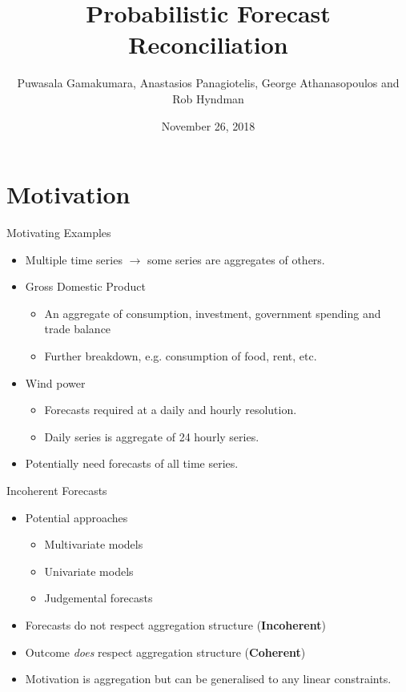 \documentclass{beamer}
\title{Probabilistic Forecast Reconciliation}
\date{November 26, 2018}
\author[GPAH]{Puwasala Gamakumara, Anastasios Panagiotelis, George Athanasopoulos and Rob Hyndman}
\begin{document}
  \begin{frame}
    \maketitle
  \end{frame}
  \section{Motivation}
  \begin{frame}{Motivating Examples}
  \begin{itemize}
  	\item Multiple time series $\rightarrow$ some series are aggregates of others.
  	\pause
  	\item Gross Domestic Product \hyperlink{GDP}{\beamerbutton{}}
  	\pause
  	\begin{itemize}
  		\item An aggregate of consumption, investment, government spending and trade balance
  		\item Further breakdown, e.g. consumption of food, rent, etc.
  	\end{itemize}
    \pause
    \item Wind power \hyperlink{aelos}{\beamerbutton{}}
    \begin{itemize}
    	\item Forecasts required at a daily and hourly resolution.
    	\item Daily series is aggregate of 24 hourly series.\label{afterdat}  
    \end{itemize}
    \pause
    \item Potentially need forecasts of all time series.
  \end{itemize}
  \end{frame}
  \begin{frame}{Incoherent Forecasts}
  \begin{itemize}
    \item Potential approaches
    \pause
  	\begin{itemize}
  		\item Multivariate models  		
  		\pause
  		\item Univariate models
  		\pause
  		\item Judgemental forecasts
  	\end{itemize}
  \pause
  \item Forecasts do not respect aggregation structure \pause({\bf Incoherent})\pause
  \item Outcome {\em does} respect aggregation  structure \pause ({\bf Coherent})\pause
  \item Motivation is aggregation but can be generalised to any linear constraints.
  \end{itemize}
  \hfill\hyperlink{bu}{\beamerbutton{}}
  \end{frame}
\end{document}
